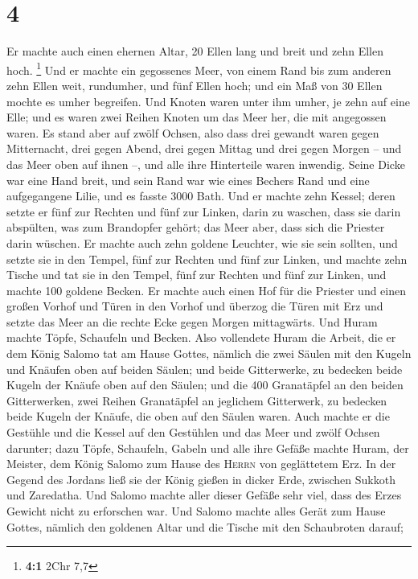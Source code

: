 \hypertarget{section-3}{%
\section{4}\label{section-3}}

 Er machte auch einen ehernen Altar, 20 Ellen lang und
breit und zehn Ellen hoch. \footnote{\textbf{4:1} 2Chr 7,7}
 Und er machte ein gegossenes Meer, von einem Rand bis zum
anderen zehn Ellen weit, rundumher, und fünf Ellen hoch; und ein Maß von
30 Ellen mochte es umher begreifen.  Und Knoten waren
unter ihm umher, je zehn auf eine Elle; und es waren zwei Reihen Knoten
um das Meer her, die mit angegossen waren.  Es stand aber
auf zwölf Ochsen, also dass drei gewandt waren gegen Mitternacht, drei
gegen Abend, drei gegen Mittag und drei gegen Morgen -- und das Meer
oben auf ihnen --, und alle ihre Hinterteile waren inwendig.
 Seine Dicke war eine Hand breit, und sein Rand war wie
eines Bechers Rand und eine aufgegangene Lilie, und es fasste 3000 Bath.
 Und er machte zehn Kessel; deren setzte er fünf zur
Rechten und fünf zur Linken, darin zu waschen, dass sie darin abspülten,
was zum Brandopfer gehört; das Meer aber, dass sich die Priester darin
wüschen.  Er machte auch zehn goldene Leuchter, wie sie
sein sollten, und setzte sie in den Tempel, fünf zur Rechten und fünf
zur Linken,  und machte zehn Tische und tat sie in den
Tempel, fünf zur Rechten und fünf zur Linken, und machte 100 goldene
Becken.  Er machte auch einen Hof für die Priester und
einen großen Vorhof und Türen in den Vorhof und überzog die Türen mit
Erz  und setzte das Meer an die rechte Ecke gegen Morgen
mittagwärts.  Und Huram machte Töpfe, Schaufeln und
Becken. Also vollendete Huram die Arbeit, die er dem König Salomo tat am
Hause Gottes,  nämlich die zwei Säulen mit den Kugeln und
Knäufen oben auf beiden Säulen; und beide Gitterwerke, zu bedecken beide
Kugeln der Knäufe oben auf den Säulen;  und die 400
Granatäpfel an den beiden Gitterwerken, zwei Reihen Granatäpfel an
jeglichem Gitterwerk, zu bedecken beide Kugeln der Knäufe, die oben auf
den Säulen waren.  Auch machte er die Gestühle und die
Kessel auf den Gestühlen  und das Meer und zwölf Ochsen
darunter;  dazu Töpfe, Schaufeln, Gabeln und alle ihre
Gefäße machte Huram, der Meister, dem König Salomo zum Hause des
\textsc{Herrn} von geglättetem Erz.  In der Gegend des
Jordans ließ sie der König gießen in dicker Erde, zwischen Sukkoth und
Zaredatha.  Und Salomo machte aller dieser Gefäße sehr
viel, dass des Erzes Gewicht nicht zu erforschen war. 
Und Salomo machte alles Gerät zum Hause Gottes, nämlich den goldenen
Altar und die Tische mit den Schaubroten darauf;


